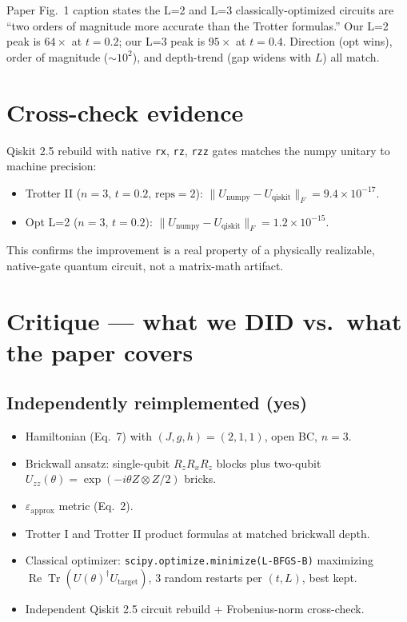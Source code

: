 \documentclass[11pt]{article}
\begin{document}
Paper Fig.~1 caption states the L=2 and L=3 classically-optimized circuits are ``two orders of
magnitude more accurate than the Trotter formulas.'' Our L=2 peak is $64\times$ at $t=0.2$;
our L=3 peak is $95\times$ at $t=0.4$. Direction (opt wins), order of magnitude ($\sim 10^2$),
and depth-trend (gap widens with $L$) all match.

\section{Cross-check evidence}

Qiskit 2.5 rebuild with native \texttt{rx}, \texttt{rz}, \texttt{rzz} gates matches the numpy
unitary to machine precision:
\begin{itemize}
  \item Trotter II ($n=3,\, t=0.2,\, \text{reps}=2$): $\|U_{\text{numpy}} - U_{\text{qiskit}}\|_F = 9.4\times 10^{-17}$.
  \item Opt L=2 ($n=3,\, t=0.2$): $\|U_{\text{numpy}} - U_{\text{qiskit}}\|_F = 1.2\times 10^{-15}$.
\end{itemize}
This confirms the improvement is a real property of a physically realizable, native-gate
quantum circuit, not a matrix-math artifact.

\section{Critique --- what we DID vs.\ what the paper covers}

\subsection*{Independently reimplemented (yes)}
\begin{itemize}
  \item Hamiltonian (Eq.~7) with $(J,g,h)=(2,1,1)$, open BC, $n=3$.
  \item Brickwall ansatz: single-qubit $R_z R_x R_z$ blocks plus two-qubit $U_{zz}(\theta) = \exp(-i\theta Z\!\otimes\! Z / 2)$ bricks.
  \item $\varepsilon_{\text{approx}}$ metric (Eq.~2).
  \item Trotter I and Trotter II product formulas at matched brickwall depth.
  \item Classical optimizer: \texttt{scipy.optimize.minimize(L-BFGS-B)} maximizing $\operatorname{Re}\operatorname{Tr}(U(\theta)^\dagger U_{\text{target}})$, 3 random restarts per $(t, L)$, best kept.
  \item Independent Qiskit 2.5 circuit rebuild + Frobenius-norm cross-check.
\end{itemize}
\end{document}
